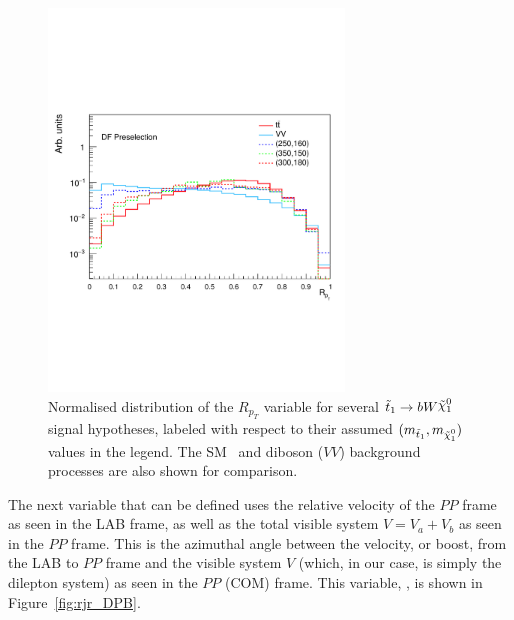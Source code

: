 \begin{figure}[!htb]
    \begin{center}
        \includegraphics[width=0.7\textwidth]{figures/search_stop2l/strategy/comp_plots/dfpresel_RPT}
        \caption{
            Normalised distribution of the $R_{p_T}$ variable for several $\stopone \rightarrow b W \ninoone$
            signal hypotheses, labeled with respect to their assumed $(m_{\stopone}, m_{\ninoone})$ values in the
            legend.
            The SM \ttbar~and diboson ($VV$) background processes are also shown for comparison.
        }
        \label{fig:rjr_RPT}
    \end{center}
\end{figure}

The next variable that can be defined uses the relative velocity of the $PP$ frame as seen
in the LAB frame, as well as the total visible system $V = V_a + V_b$ as seen in the $PP$ frame.
This is the azimuthal angle between the velocity, or boost, from the LAB to $PP$ frame and the visible
system $V$ (which, in our case, is simply the dilepton system) as seen in the $PP$ (COM) frame.
This variable, \dpb, is shown in Figure~\ref{fig:rjr_DPB}.

